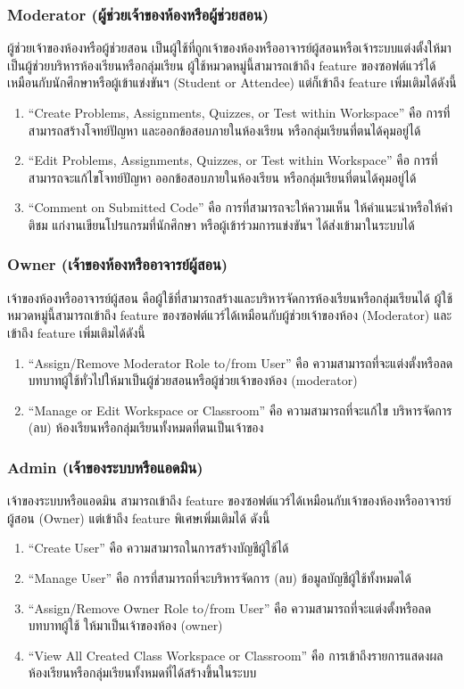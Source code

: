 \documentclass[12pt,one side,openright,a4paper]{cpe-thesis-th}
\newcommand{\thaijustify}[1]{%
  \par\hspace{30pt}\justifying
  #1
}
\begin{document}
\subsubsection{Moderator (ผู้ช่วยเจ้าของห้องหรือผู้ช่วยสอน)}
\thaijustify{
  ผู้ช่วยเจ้าของห้องหรือผู้ช่วยสอน เป็นผู้ใช้ที่ถูกเจ้าของห้องหรืออาจารย์ผู้สอนหรือเจ้าระบบแต่งตั้งให้มาเป็นผู้ช่วยบริหารห้องเรียนหรือกลุ่มเรียน ผู้ใช้หมวดหมู่นี้สามารถเข้าถึง feature ของซอฟต์แวร์ได้เหมือนกับนักศึกษาหรือผู้เข้าแข่งขันฯ (Student or Attendee) แต่ก็เข้าถึง feature เพิ่มเติมได้ดังนี้
}
\begin{enumerate}
  \item “Create Problems, Assignments, Quizzes, or Test within Workspace” คือ การที่สามารถสร้างโจทย์ปัญหา และออกข้อสอบภายในห้องเรียน หรือกลุ่มเรียนที่ตนได้คุมอยู่ได้
  \item “Edit Problems, Assignments, Quizzes, or Test within Workspace” คือ การที่สามารถจะแก้ไขโจทย์ปัญหา ออกข้อสอบภายในห้องเรียน หรือกลุ่มเรียนที่ตนได้คุมอยู่ได้
  \item “Comment on Submitted Code” คือ การที่สามารถจะให้ความเห็น ให้คำแนะนำหรือให้คำติชม แก่งานเขียนโปรแกรมที่นักศึกษา หรือผู้เข้าร่วมการแข่งขันฯ ได้ส่งเข้ามาในระบบได้
\end{enumerate}
\subsubsection{Owner (เจ้าของห้องหรืออาจารย์ผู้สอน)}
\thaijustify{
  เจ้าของห้องหรืออาจารย์ผู้สอน คือผู้ใช้ที่สามารถสร้างและบริหารจัดการห้องเรียนหรือกลุ่มเรียนได้ ผู้ใช้หมวดหมู่นี้สามารถเข้าถึง feature ของซอฟต์แวร์ได้เหมือนกับผู้ช่วยเจ้าของห้อง (Moderator) และเข้าถึง feature เพิ่มเติมได้ดังนี้
}
\begin{enumerate}
  \item “Assign/Remove Moderator Role to/from User” คือ ความสามารถที่จะแต่งตั้งหรือลดบทบาทผู้ใช้ทั่วไปให้มาเป็นผู้ช่วยสอนหรือผู้ช่วยเจ้าของห้อง (moderator)
  \item “Manage or Edit Workspace or Classroom” คือ ความสามารถที่จะแก้ไข บริหารจัดการ (ลบ) ห้องเรียนหรือกลุ่มเรียนทั้งหมดที่ตนเป็นเจ้าของ
\end{enumerate}
\subsubsection{Admin (เจ้าของระบบหรือแอดมิน)}
\thaijustify{
  เจ้าของระบบหรือแอดมิน สามารถเข้าถึง feature ของซอฟต์แวร์ได้เหมือนกับเจ้าของห้องหรืออาจารย์ผู้สอน (Owner) แต่เข้าถึง feature พิเศษเพิ่มเติมได้ ดังนี้
}
\begin{enumerate}
  \item “Create User” คือ ความสามารถในการสร้างบัญชีผู้ใช้ได้
  \item “Manage User” คือ การที่สามารถที่จะบริหารจัดการ (ลบ) ข้อมูลบัญชีผู้ใช้ทั้งหมดได้
  \item “Assign/Remove Owner Role to/from User” คือ ความสามารถที่จะแต่งตั้งหรือลดบทบาทผู้ใช้ ให้มาเป็นเจ้าของห้อง (owner)
  \item “View All Created Class Workspace or Classroom” คือ การเข้าถึงรายการแสดงผลห้องเรียนหรือกลุ่มเรียนทั้งหมดที่ได้สร้างขึ้นในระบบ
\end{enumerate}
\pagebreak
\end{document}
